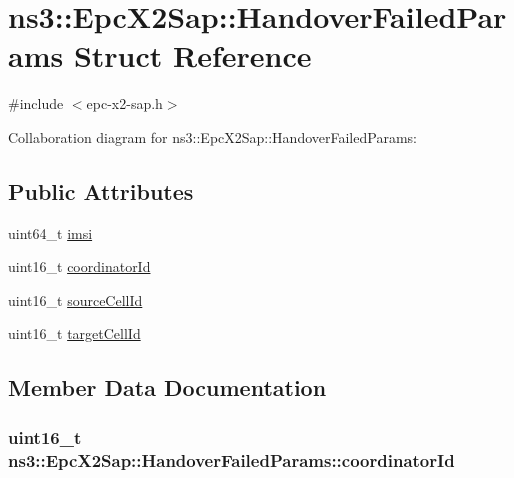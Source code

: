 \hypertarget{structns3_1_1EpcX2Sap_1_1HandoverFailedParams}{}\section{ns3\+:\+:Epc\+X2\+Sap\+:\+:Handover\+Failed\+Params Struct Reference}
\label{structns3_1_1EpcX2Sap_1_1HandoverFailedParams}


{\ttfamily \#include $<$epc-\/x2-\/sap.\+h$>$}



Collaboration diagram for ns3\+:\+:Epc\+X2\+Sap\+:\+:Handover\+Failed\+Params\+:
\subsection*{Public Attributes}
\begin{DoxyCompactItemize}
\item 
uint64\+\_\+t \hyperlink{structns3_1_1EpcX2Sap_1_1HandoverFailedParams_ace44d3a3caec19a22427034ed95e27d5}{imsi}
\item 
uint16\+\_\+t \hyperlink{structns3_1_1EpcX2Sap_1_1HandoverFailedParams_a26c1f0aa8ef95837838fd19041ab9431}{coordinator\+Id}
\item 
uint16\+\_\+t \hyperlink{structns3_1_1EpcX2Sap_1_1HandoverFailedParams_a8a7ba9006e9f850c7dd56166036dc4de}{source\+Cell\+Id}
\item 
uint16\+\_\+t \hyperlink{structns3_1_1EpcX2Sap_1_1HandoverFailedParams_ac095eb889d449376b59166f95253f329}{target\+Cell\+Id}
\end{DoxyCompactItemize}


\subsection{Member Data Documentation}
\subsubsection[{\texorpdfstring{coordinator\+Id}{coordinatorId}}]{\setlength{\rightskip}{0pt plus 5cm}uint16\+\_\+t ns3\+::\+Epc\+X2\+Sap\+::\+Handover\+Failed\+Params\+::coordinator\+Id}\hypertarget{structns3_1_1EpcX2Sap_1_1HandoverFailedParams_a26c1f0aa8ef95837838fd19041ab9431}{}\label{structns3_1_1EpcX2Sap_1_1HandoverFailedParams_a26c1f0aa8ef95837838fd19041ab9431}
